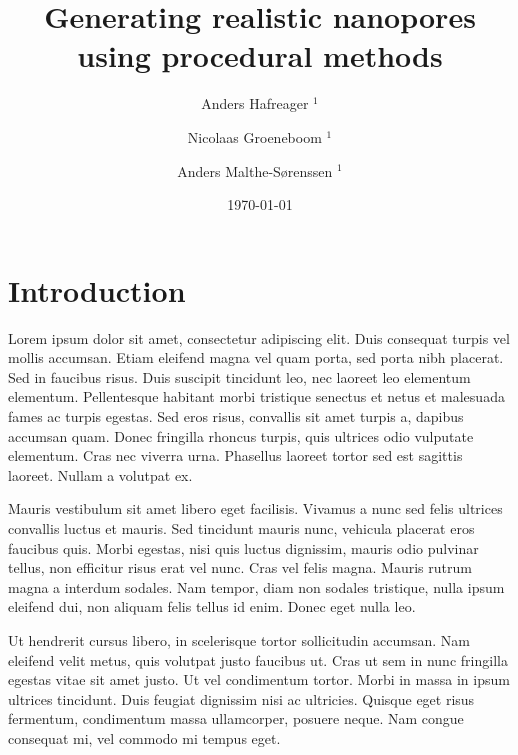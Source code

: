 \documentclass[aps,pre,twocolumn,letterpaper,floatfix,showpacs]{revtex4}
\begin{document}
\title{Generating realistic nanopores using procedural methods}
\author{Anders Hafreager $^{1}$} 
\author{Nicolaas Groeneboom $^{1}$} 
\author{Anders Malthe-S\o renssen $^1$}
\date{\today} 

\begin{abstract} 
\end{abstract} 
 
\maketitle
 
\section{Introduction}
Lorem ipsum dolor sit amet, consectetur adipiscing elit. Duis consequat turpis vel mollis accumsan. Etiam eleifend magna vel quam porta, sed porta nibh placerat. Sed in faucibus risus. Duis suscipit tincidunt leo, nec laoreet leo elementum elementum. Pellentesque habitant morbi tristique senectus et netus et malesuada fames ac turpis egestas. Sed eros risus, convallis sit amet turpis a, dapibus accumsan quam. Donec fringilla rhoncus turpis, quis ultrices odio vulputate elementum. Cras nec viverra urna. Phasellus laoreet tortor sed est sagittis laoreet. Nullam a volutpat ex.

Mauris vestibulum sit amet libero eget facilisis. Vivamus a nunc sed felis ultrices convallis luctus et mauris. Sed tincidunt mauris nunc, vehicula placerat eros faucibus quis. Morbi egestas, nisi quis luctus dignissim, mauris odio pulvinar tellus, non efficitur risus erat vel nunc. Cras vel felis magna. Mauris rutrum magna a interdum sodales. Nam tempor, diam non sodales tristique, nulla ipsum eleifend dui, non aliquam felis tellus id enim. Donec eget nulla leo.

Ut hendrerit cursus libero, in scelerisque tortor sollicitudin accumsan. Nam eleifend velit metus, quis volutpat justo faucibus ut. Cras ut sem in nunc fringilla egestas vitae sit amet justo. Ut vel condimentum tortor. Morbi in massa in ipsum ultrices tincidunt. Duis feugiat dignissim nisi ac ultricies. Quisque eget risus fermentum, condimentum massa ullamcorper, posuere neque. Nam congue consequat mi, vel commodo mi tempus eget.
\end{document}
